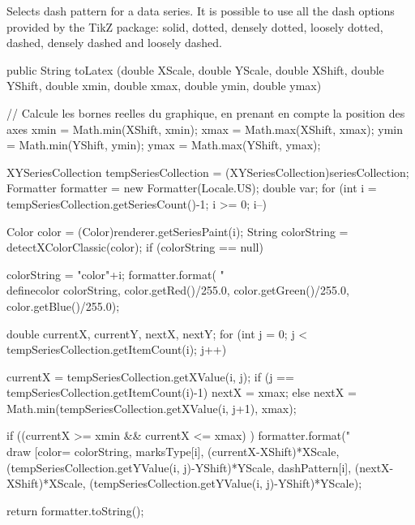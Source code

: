 \begin{tabb}
   Selects dash pattern for a data series.
   It is possible to use all the dash options provided by
   the TikZ package: solid, dotted, densely dotted,
   loosely dotted, dashed, densely dashed and loosely dashed.
\end{tabb}
\begin{htmlonly}
\end{htmlonly}
\begin{code}

   public String toLatex (double XScale, double YScale,
                          double XShift, double YShift,
                          double xmin, double xmax,
                          double ymin, double ymax) \begin{hide} {

      // Calcule les bornes reelles du graphique, en prenant en compte la position des axes
      xmin = Math.min(XShift, xmin);
      xmax = Math.max(XShift, xmax);
      ymin = Math.min(YShift, ymin);
      ymax = Math.max(YShift, ymax);

      XYSeriesCollection tempSeriesCollection = (XYSeriesCollection)seriesCollection;
      Formatter formatter = new Formatter(Locale.US);
      double var;
      for (int i = tempSeriesCollection.getSeriesCount()-1; i >= 0; i--) {

         Color color = (Color)renderer.getSeriesPaint(i);
         String colorString = detectXColorClassic(color);
         if (colorString == null) {
            colorString = "color"+i;
            formatter.format( "\\definecolor{%
                              colorString, color.getRed()/255.0, color.getGreen()/255.0, color.getBlue()/255.0);
         }

         double currentX, currentY, nextX, nextY;
         for (int j = 0; j < tempSeriesCollection.getItemCount(i); j++) {
            currentX = tempSeriesCollection.getXValue(i, j);
            if (j == tempSeriesCollection.getItemCount(i)-1)
               nextX = xmax;
            else
               nextX = Math.min(tempSeriesCollection.getXValue(i, j+1), xmax);

            if ((currentX >= xmin && currentX <= xmax) )
            {
               formatter.format("\\draw [color=%
                        colorString, marksType[i],
                        (currentX-XShift)*XScale, (tempSeriesCollection.getYValue(i, j)-YShift)*YScale,
                        dashPattern[i],
                        (nextX-XShift)*XScale, (tempSeriesCollection.getYValue(i, j)-YShift)*YScale);
            }
         }
      }
      return formatter.toString();
   }
}\end{hide}
\end{code}
